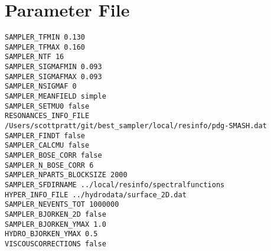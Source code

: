 \section{Parameter File}
{\tt\begin{verbatim}
SAMPLER_TFMIN 0.130
SAMPLER_TFMAX 0.160
SAMPLER_NTF 16
SAMPLER_SIGMAFMIN 0.093
SAMPLER_SIGMAFMAX 0.093
SAMPLER_NSIGMAF 0
SAMPLER_MEANFIELD simple
SAMPLER_SETMU0 false
RESONANCES_INFO_FILE /Users/scottpratt/git/best_sampler/local/resinfo/pdg-SMASH.dat
SAMPLER_FINDT false
SAMPLER_CALCMU false
SAMPLER_BOSE_CORR false
SAMPLER_N_BOSE_CORR 6
SAMPLER_NPARTS_BLOCKSIZE 2000
SAMPLER_SFDIRNAME ../local/resinfo/spectralfunctions
HYPER_INFO_FILE ../hydrodata/surface_2D.dat
SAMPLER_NEVENTS_TOT 1000000
SAMPLER_BJORKEN_2D false
SAMPLER_BJORKEN_YMAX 1.0
HYDRO_BJORKEN_YMAX 0.5
VISCOUSCORRECTIONS false

\end{verbatim}}
